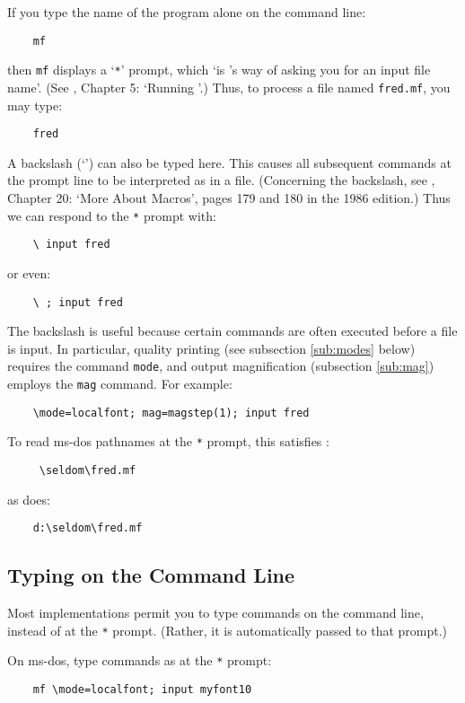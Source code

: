 If you type the name of the \MF{} program alone on the command line:
\begin{verbatim}
    mf
\end{verbatim}
then {\tt mf} displays a `{\tt **}' prompt,
which
`is \MF{}'s way of asking you for an input file name'.
(See \MFbook{}, Chapter 5: `Running \MF{}'.)
Thus, to process a \MF{} file named {\tt fred.mf}, you may type:
\begin{verbatim}
    fred
\end{verbatim}

A backslash (`\ttbsl') can also be typed here.
This causes all subsequent commands at the prompt line to be
interpreted as in a \MF{} file.
(Concerning the backslash, see \MFbook{}, Chapter 20:
`More About Macros', pages 179 and 180 in the 1986 edition.)
Thus we can respond to the {\tt **} prompt with:
\begin{verbatim}
    \ input fred
\end{verbatim}
or even:
\begin{verbatim}
    \ ; input fred
\end{verbatim}

The backslash is useful because
certain commands are often executed before a \MF{} file is input.
In particular, quality printing
(see subsection \ref{sub:modes} below)
requires the \MF{} command {\tt mode},
and output magnification
(subsection \ref{sub:mag})
employs the {\tt mag} command.
For example:
\begin{verbatim}
    \mode=localfont; mag=magstep(1); input fred
\end{verbatim}

To read {\sc ms-dos} pathnames at the {\tt **} prompt,
this satisfies \MF{}:
\begin{verbatim}
     \seldom\fred.mf
\end{verbatim}
as does:
\begin{verbatim}
    d:\seldom\fred.mf
\end{verbatim}


\subsection{Typing on the Command Line}\label{sub:cmdline}

Most \MF{} implementations permit you to type \MF{} commands on the
command line, instead of at the {\tt **} prompt.  (Rather, it is
automatically passed to that prompt.)

On {\sc ms-dos}, type commands as at the {\tt **} prompt:
\begin{verbatim}
    mf \mode=localfont; input myfont10
\end{verbatim}

